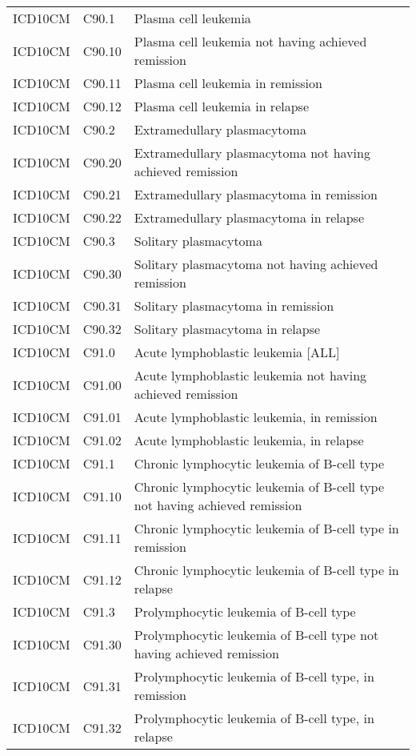 \begin{table}[ht]
\begin{tabular}{lll}
  ICD10CM & C90.1 & Plasma cell leukemia \\ 
  ICD10CM & C90.10 & Plasma cell leukemia not having achieved remission \\ 
  ICD10CM & C90.11 & Plasma cell leukemia in remission \\ 
  ICD10CM & C90.12 & Plasma cell leukemia in relapse \\ 
  ICD10CM & C90.2 & Extramedullary plasmacytoma \\ 
  ICD10CM & C90.20 & Extramedullary plasmacytoma not having achieved remission \\ 
  ICD10CM & C90.21 & Extramedullary plasmacytoma in remission \\ 
  ICD10CM & C90.22 & Extramedullary plasmacytoma in relapse \\ 
  ICD10CM & C90.3 & Solitary plasmacytoma \\ 
  ICD10CM & C90.30 & Solitary plasmacytoma not having achieved remission \\ 
  ICD10CM & C90.31 & Solitary plasmacytoma in remission \\ 
  ICD10CM & C90.32 & Solitary plasmacytoma in relapse \\ 
  ICD10CM & C91.0 & Acute lymphoblastic leukemia [ALL] \\ 
  ICD10CM & C91.00 & Acute lymphoblastic leukemia not having achieved remission \\ 
  ICD10CM & C91.01 & Acute lymphoblastic leukemia, in remission \\ 
  ICD10CM & C91.02 & Acute lymphoblastic leukemia, in relapse \\ 
  ICD10CM & C91.1 & Chronic lymphocytic leukemia of B-cell type \\ 
  ICD10CM & C91.10 & Chronic lymphocytic leukemia of B-cell type not having achieved remission \\ 
  ICD10CM & C91.11 & Chronic lymphocytic leukemia of B-cell type in remission \\ 
  ICD10CM & C91.12 & Chronic lymphocytic leukemia of B-cell type in relapse \\ 
  ICD10CM & C91.3 & Prolymphocytic leukemia of B-cell type \\ 
  ICD10CM & C91.30 & Prolymphocytic leukemia of B-cell type not having achieved remission \\ 
  ICD10CM & C91.31 & Prolymphocytic leukemia of B-cell type, in remission \\ 
  ICD10CM & C91.32 & Prolymphocytic leukemia of B-cell type, in relapse \\ 

\end{tabular}
\end{table}
